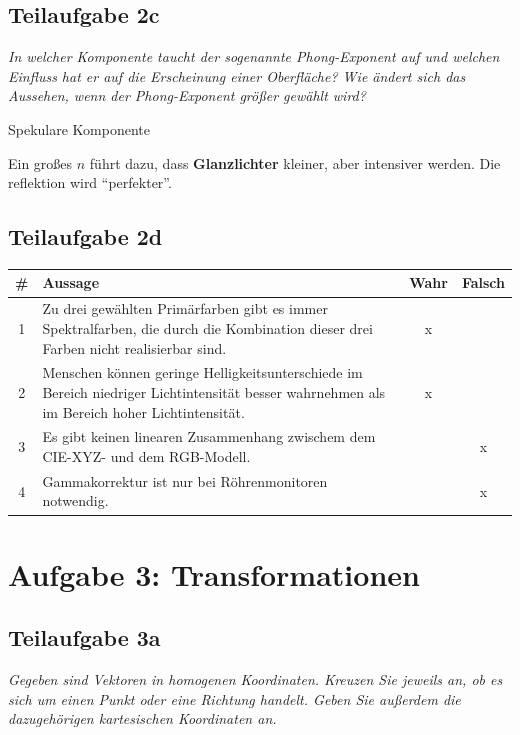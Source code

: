 \documentclass[a4paper]{scrartcl}
\begin{document}
\subsection*{Teilaufgabe 2c}
\textit{In welcher Komponente taucht der sogenannte Phong-Exponent auf und
welchen Einfluss hat er auf die Erscheinung einer Oberfläche? Wie ändert sich
das Aussehen, wenn der Phong-Exponent größer gewählt wird?}

Spekulare Komponente

Ein großes $n$ führt dazu, dass \textbf{Glanzlichter} kleiner, aber intensiver
werden. Die reflektion wird \enquote{perfekter}.

\subsection*{Teilaufgabe 2d}
\begin{tabular}{cp{12cm}cc}\toprule
\# & Aussage                                                                                                                                      & Wahr & Falsch \\\midrule
1  & Zu drei gewählten Primärfarben gibt es immer Spektralfarben, die durch die Kombination dieser drei Farben nicht realisierbar sind.           & x    & ~      \\
2  & Menschen können geringe Helligkeitsunterschiede im Bereich niedriger Lichtintensität besser wahrnehmen als im Bereich hoher Lichtintensität. & x    & ~      \\
3  & Es gibt keinen linearen Zusammenhang zwischem dem CIE-XYZ- und dem RGB-Modell.                                                               & ~    & x      \\
4  & Gammakorrektur ist nur bei Röhrenmonitoren notwendig.                                                                                        & ~    & x      \\\bottomrule
\end{tabular}


\section*{Aufgabe 3: Transformationen}
\subsection*{Teilaufgabe 3a}
\textit{Gegeben sind Vektoren in homogenen Koordinaten. Kreuzen Sie jeweils an,
ob es sich um einen Punkt oder eine Richtung handelt. Geben Sie außerdem die
dazugehörigen kartesischen Koordinaten an.}
\end{document}
